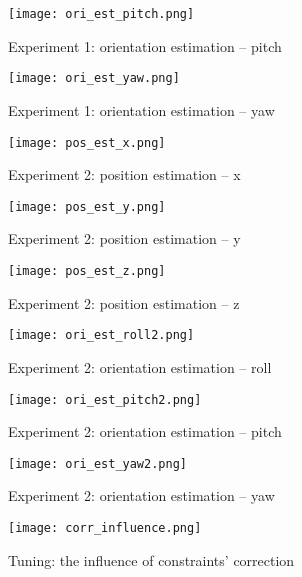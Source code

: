 \begin{figure}[p]
	\centering
	\texttt{[image: ori\_est\_pitch.png]}
	\caption{Experiment 1: orientation estimation -- pitch}
	\label{ori_est_pitch}
\end{figure}


\begin{figure}[p]
	\centering
	\texttt{[image: ori\_est\_yaw.png]}
	\caption{Experiment 1: orientation estimation -- yaw}
	\label{ori_est_yaw}
\end{figure}

\begin{figure}[p]
	\centering
	\texttt{[image: pos\_est\_x.png]}
	\caption{Experiment 2: position estimation -- x}
	\label{pos_est_x}
\end{figure}

\begin{figure}[p]
	\centering
	\texttt{[image: pos\_est\_y.png]}
	\caption{Experiment 2: position estimation -- y}
	\label{pos_est_y}
\end{figure}

\begin{figure}[p]
	\centering
	\texttt{[image: pos\_est\_z.png]}
	\caption{Experiment 2: position estimation -- z}
	\label{pos_est_z}
\end{figure}

\begin{figure}[p]
	\centering
	\texttt{[image: ori\_est\_roll2.png]}
	\caption{Experiment 2: orientation estimation -- roll}
	\label{ori_est_roll2}
\end{figure}

\begin{figure}[p]
	\centering
	\texttt{[image: ori\_est\_pitch2.png]}
	\caption{Experiment 2: orientation estimation -- pitch}
	\label{ori_est_pitch2}
\end{figure}


\begin{figure}[p]
	\centering
	\texttt{[image: ori\_est\_yaw2.png]}
	\caption{Experiment 2: orientation estimation -- yaw}
	\label{ori_est_yaw2}
\end{figure}


\begin{figure}[p]
	\centering
	\texttt{[image: corr\_influence.png]}
	\caption{Tuning: the influence of constraints' correction}
	\label{corr_strength}
\end{figure}


